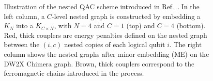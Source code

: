 \begin{figure}[t]
\begin{center}
\caption{Illustration of the nested QAC scheme introduced in Ref.~\cite{vinci2015nested}. In the left column, a  $C$-level nested graph is constructed by embedding a $K_N$ into a $K_{C\times N}$, with $N=4$ and $C=1$ (top) and $C=4$ (bottom). Red, thick
couplers are energy penalties defined on the nested graph between the $(i,c)$ nested copies of each logical qubit $i$.
The right column shows the nested graphs after minor embedding (ME) on the DW2X Chimera graph. Brown, thick couplers correspond to the ferromagnetic chains introduced in the process.
}
\label{fig:NQAC}
\end{center}
\end{figure}

